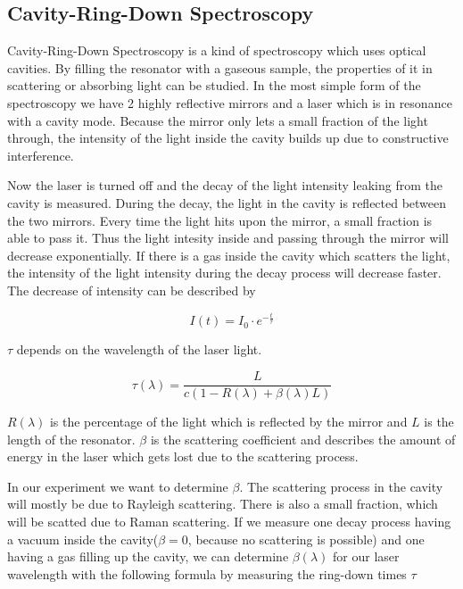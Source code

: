 \documentclass[10pt,a4paper]{article}
\begin{document}
\subsection{Cavity-Ring-Down Spectroscopy}

Cavity-Ring-Down Spectroscopy is a kind of spectroscopy which uses optical cavities. By filling the resonator with a gaseous sample, the properties of it in scattering or absorbing light can be studied. In the most simple form of the spectroscopy we have 2 highly reflective mirrors and a laser which is in resonance with a cavity mode. Because the mirror only lets a small fraction of the light through, the intensity of the light inside the cavity builds up due to constructive interference. 

Now the laser is turned off and the decay of the light intensity leaking from the cavity is measured. During the decay, the light in the cavity is reflected between the two mirrors. Every time the light hits upon the mirror, a small fraction is able to pass it. Thus the light intesity inside and passing through the mirror will decrease exponentially. If there is a gas inside the cavity which scatters the light, the intensity of the light intensity during the decay process will decrease faster. The decrease of intensity can be described by

\begin{equation}
I(t) = I_0 \cdot e^{- \frac{t}{\tau}}
\end{equation}

$\tau$ depends on the wavelength of the laser light.

\begin{equation}
\tau (\lambda) = \frac{L}{c (1- R(\lambda) + \beta(\lambda) L)}
\label{tau_formel}
\end{equation}

$R(\lambda)$ is the percentage of the light which is reflected by the mirror and $L$ is the length of the resonator. $\beta$ is the scattering coefficient and describes the amount of energy in the laser which gets lost due to the scattering process.

In our experiment we want to determine $\beta$. The scattering process in the cavity will mostly be due to Rayleigh scattering. There is also a small fraction, which will be scatted due to Raman scattering. If we measure one decay process having a vacuum inside the cavity($\beta = 0$, because no scattering is possible) and one having a gas filling up the cavity, we can determine $\beta(\lambda)$ for our laser wavelength with the following formula by measuring the ring-down times $\tau$
\end{document}
